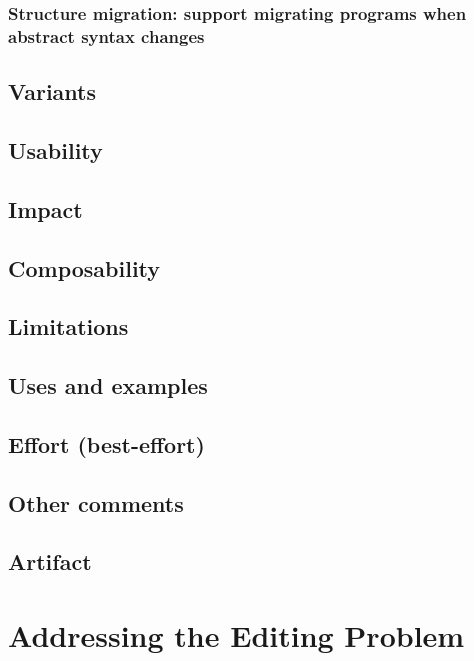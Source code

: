 \documentclass[preprint,numbers,10pt]{sigplanconf}
\begin{document}
\subsubsection{Structure migration: support migrating programs when abstract syntax changes}

\subsection{Variants}

\subsection{Usability}

\subsection{Impact}

\subsection{Composability}

\subsection{Limitations}

\subsection{Uses and examples}

\subsection{Effort (best-effort)}

\subsection{Other comments}

\subsection{Artifact}

%
%

\section{Addressing the Editing Problem}
\end{document}
